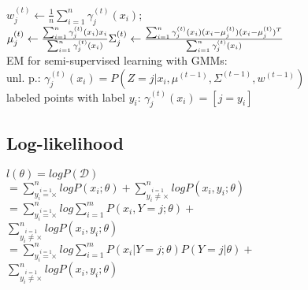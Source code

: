 $w_j^{(t)} \leftarrow \frac{1}{n} \sum_{i=1}^n \gamma_j^{(t)} (x_i)$;  %
$\mu_j^{(t)} \leftarrow \frac{\sum_{i=1}^n \gamma_j^{(t)} (x_i) x_i}{\sum_{i=1}^n \gamma_j^{(t)} (x_i)}\\ %
\Sigma_j^{(t)} \leftarrow \frac{\sum_{i=1}^n \gamma_j^{(t)}(x_i) (x_i - \mu_j^{(t)}) (x_i - \mu_j^{(t)})^T}{\sum_{i=1}^n \gamma_j^{(t)}(x_i)}$\\ %
EM for semi-supervised learning with GMMs:\\
unl. p.: $\gamma_j^{(t)}(x_i) = P(Z=j|x_i, \mu^{(t-1)}, \Sigma^{(t-1)}, w^{(t-1)})$\\
labeled points with label $y_i$: $\gamma_j^{(t)}(x_i) = [j = y_i]$


\iffalse
\subsection*{Log-likelihood}
$l(\theta) = log P(\mathcal{D})$ \\
$=\sum_{\overset{i=1}{y_i=\times}}^n log P(x_i;\theta) + \sum_{\overset{i=1}{y_i\not=\times}}^n log P(x_i,y_i;\theta)$\\
$=\sum_{\overset{i=1}{y_i=\times}}^n log \sum_{i=1}^m P(x_i, Y=j;\theta) +$\\
$ \sum_{\overset{i=1}{y_i\not=\times}}^n log P(x_i,y_i;\theta)$\\
$=\sum_{\overset{i=1}{y_i=\times}}^n log \sum_{i=1}^m P(x_i|Y=j;\theta)P(Y=j|\theta) +$\\
$ \sum_{\overset{i=1}{y_i\not=\times}}^n log P(x_i,y_i;\theta)$

